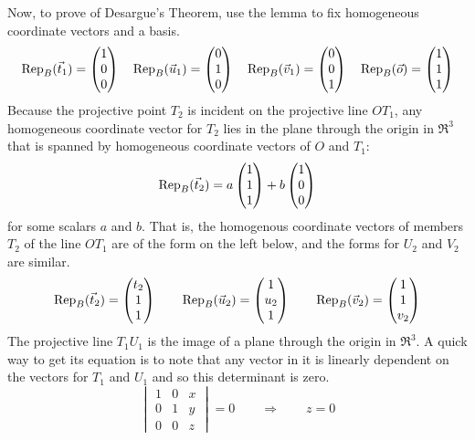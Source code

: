Now, to prove of Desargue's Theorem, use the lemma to fix homogeneous
coordinate vectors and a basis.
\begin{equation*}
  \rep{\vec{t}_1}{B}=\colvec{1 \\ 0 \\ 0}
  \quad
  \rep{\vec{u}_1}{B}=\colvec{0 \\ 1 \\ 0}
  \quad
  \rep{\vec{v}_1}{B}=\colvec{0 \\ 0 \\ 1}
  \quad
  \rep{\vec{o}}{B}=\colvec{1 \\ 1 \\ 1}    
\end{equation*}
Because the projective point $T_2$ is incident on the projective line $OT_1$,
any homogeneous coordinate vector for $T_2$ lies in the
plane through the origin in $\Re^3$ that is spanned by homogeneous
coordinate vectors of $O$ and $T_1$:
\begin{equation*}
  \rep{\vec{t}_2}{B}=a\colvec{1 \\ 1 \\ 1}
                          +b\colvec{1 \\ 0 \\ 0}
\end{equation*}
for some scalars $a$ and $b$.
That is, the homogenous coordinate vectors of members $T_2$ of the line 
$OT_1$ are 
of the form on the left below, and the forms for $U_2$ and $V_2$ are similar. 
\begin{equation*}
  \rep{\vec{t}_2}{B}=\colvec{t_2 \\ 1 \\ 1}
  \qquad
  \rep{\vec{u}_2}{B}=\colvec{1 \\ u_2 \\ 1}
  \qquad
  \rep{\vec{v}_2}{B}=\colvec{1 \\ 1 \\ v_2}
\end{equation*}
The projective line $T_1U_1$ is the image of a plane through the 
origin in $\Re^3$.
A quick way to get its equation is to note that any vector in it
is linearly dependent on the vectors for $T_1$ and
$U_1$ and so this determinant is zero.
\begin{equation*}
  \begin{vmatrix}
    1  &0  &x  \\
    0  &1  &y  \\
    0  &0  &z
  \end{vmatrix}=0
  \qquad
  \Longrightarrow
  \qquad
  z=0
\end{equation*}
